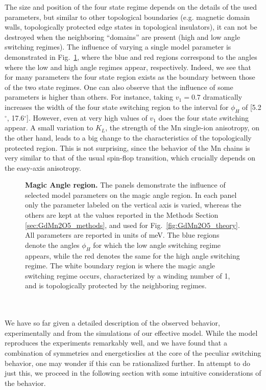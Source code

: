 The size and position of the four state regime depends on the details of the used parameters, but similar to other topological boundaries (e.g. magnetic domain walls, topologically protected edge states in topological insulators), it can not be destroyed when the neighboring ``domains'' are present (high and low angle switching regimes).
The influence of varying a single model parameter is demonstrated in Fig.~\ref{fig:GdMn2O5_windingvsparam}, where the blue and red regions correspond to the angles where the low and high angle regimes appear, respectively.
Indeed, we see that for many parameters the four state region exists as the boundary between those of the two state regimes.
One can also observe that the influence of some parameters is higher than others. For instance, taking $v_1=0.7$ dramatically increases the width of the four state switching region to the interval for $\phi_H$ of [5.2$^\circ$, 17.6$^\circ$].
However, even at very high values of $v_1$ does the four state switching appear.
A small variation to $K_L$, the strength of the Mn single-ion anisotropy, on the other hand, leads to a big change to the characteristics of the topologically protected region.
This is not surprising, since the behavior of the Mn chains is very similar to that of the usual spin-flop transition, which crucially depends on the easy-axis anisotropy.
\begin{figure}[h!]
	\caption{\label{fig:GdMn2O5_windingvsparam} {\bf Magic Angle region.} The panels demonstrate the influence of selected model parameters on the magic angle region. In each panel only the parameter labeled on the vertical axis is varied, whereas the others are kept at the values reported in the Methods Section \ref{sec:GdMn2O5_methods}, and used for Fig.~\ref{fig:GdMn2O5_theory}. All parameters are reported in units of meV. The blue regions denote the angles $\phi_H$ for which the low angle switching regime appears, while the red denotes the same for the high angle switching regime. The white boundary region is where the magic angle switching regime occurs, characterized by a winding number of 1, and is topologically protected by the neighboring regimes.}
\end{figure}
\\\\
We have so far given a detailed description of the observed behavior, experimentally and from the simulations of our effective model.
While the model reproduces the experiments remarkably well, and we have found that a combination of symmetries and energeticslies at the core of the peculiar switching behavior, one may wonder if this can be rationalized further.
In attempt to do just this, we proceed in the following section with some intuitive considerations of the behavior.

